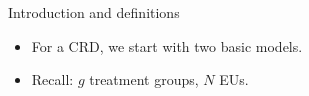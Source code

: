 \begin{frame}[allowframebreaks]{Introduction and definitions}
  \framebreak

  \begin{itemize}
    \item For a CRD, we start with two basic models. 
    \item Recall: $g$ treatment groups, $N$ EUs.
  \end{itemize}
    
    

\end{frame}
